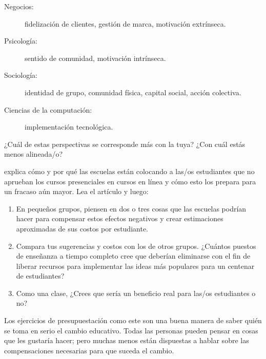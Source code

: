 \begin{description}

\item[Negocios:]
  fidelización de clientes, gestión de marca, motivación extrínseca.

\item[Psicología:]
  sentido de comunidad, motivación intrínseca.

\item[Sociología:]
  identidad de grupo, comunidad física, capital social, acción colectiva.

\item[Ciencias de la computación:]
  implementación tecnológica.

\end{description}

¿Cuál de estas perspectivas se corresponde más con la tuya?
¿Con cuál estás menos alineada/o?


explica cómo y por qué las escuelas están colocando a las/os estudiantes que no aprueban los cursos presenciales en cursos en línea
y cómo esto los prepara para un fracaso aún mayor.
Lea el artículo y luego:

\begin{enumerate}

\item
  En pequeños grupos,
  piensen en dos o tres cosas que las escuelas podrían hacer para compensar estos efectos negativos
  y crear estimaciones aproximadas de sus costos por estudiante.

\item
  Compara tus sugerencias y costos con los de otros grupos.
  ¿Cuántos puestos de enseñanza a tiempo completo cree que deberían eliminarse
  con el fin de liberar recursos para implementar las ideas más populares para un centenar de estudiantes?

\item
  Como una clase,
  ¿Crees que sería un beneficio real para las/os estudiantes o no?

\end{enumerate}

Los ejercicios de presupuestación como este son una buena manera de saber quién se toma en serio el cambio educativo.
Todas las personas pueden pensar en cosas que les gustaría hacer;
pero muchas menos están dispuestas a hablar sobre las compensaciones necesarias para que suceda el cambio.

